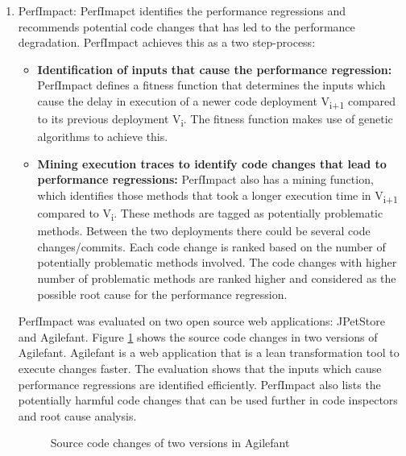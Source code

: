 \documentclass[article,type=msc,colorback,12pt,accentcolor=tud8b,table]{tudthesis}
\begin{document}
	 \begin{enumerate}
	 \item{PerfImpact:} 
	 PerfImapct identifies the performance regressions and recommends potential code changes that has led to the performance degradation. PerfImpact achieves this as a two step-process: 
	 
	 \begin{itemize}
\item{\textbf{Identification of inputs that cause the performance regression:}} 
\newline
PerfImpact defines a fitness function that determines the inputs which cause the delay in execution of a newer code deployment V\textsubscript{i+1} compared to its previous deployment V\textsubscript{i}. The fitness function makes use of genetic algorithms to achieve this. 
 
\item {\textbf{Mining execution traces to identify code changes that lead to performance regressions:}} 
\newline
PerfImpact also has a mining function, which identifies those methods that took a longer execution time in V\textsubscript{i+1} compared to V\textsubscript{i}. These methods are tagged as potentially problematic methods. Between the two deployments there could be several code changes/commits. Each code change is ranked based on the number of potentially problematic methods involved. The code changes with higher number of problematic methods are ranked higher and considered as the possible root cause for the performance regression. 	 
	 
	 \end{itemize}
	
PerfImpact was evaluated on two open source web applications: JPetStore\cite{Jpetstore} and Agilefant\cite{Agilefant}. Figure \ref{fig:agilefant}  shows the source code changes in two versions of Agilefant. Agilefant is a web application that is a lean transformation tool to execute changes faster. The evaluation shows that the inputs which cause performance regressions are identified efficiently. PerfImpact also lists the potentially harmful code changes that can be used further in code inspectors and root cause analysis.

 \begin{figure}
 \begin{center}
  \makebox[\textwidth]{\texttt{[image: B1]}}
  \makebox[\textwidth]{\texttt{[image: B2]}}
\end{center}
\caption{Source code changes of two versions in Agilefant \cite{luo2016mining}}
\label{fig:agilefant}
\end{figure}



\end{enumerate}
\end{document}

